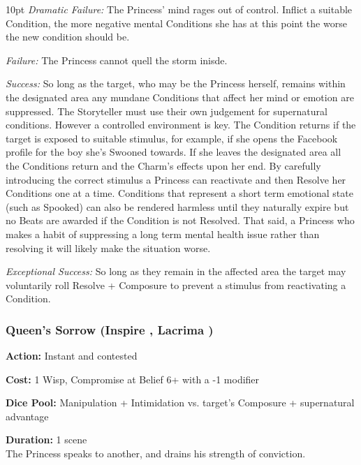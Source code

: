 \begin{myindentpar}{10pt}    \emph{Dramatic Failure:} The Princess' mind rages out of control. Inflict a suitable Condition, the more negative mental Conditions she has at this point the worse the new condition should be.

    \emph{Failure:} The Princess cannot quell the storm inisde. 

    \emph{Success:} So long as the target, who may be the Princess herself, remains within the designated area any mundane Conditions that affect her mind or emotion are suppressed. The Storyteller must use their own judgement for supernatural conditions. However a controlled environment is key. The Condition returns if the target is exposed to suitable stimulus, for example, if she opens the Facebook profile for the boy she's Swooned towards. If she leaves the designated area all the Conditions return and the Charm's effects upon her end. By carefully introducing the correct stimulus a Princess can reactivate and then Resolve her Conditions one at a time. Conditions that represent a short term emotional state (such as Spooked) can also be rendered harmless until they naturally expire but no Beats are awarded if the Condition is not Resolved. That said, a Princess who makes a habit of suppressing a long term mental health issue rather than resolving it will likely make the situation worse. 

    \emph{Exceptional Success:} So long as they remain in the affected area the target may voluntarily roll Resolve + Composure to prevent a stimulus from reactivating a Condition. 

\end{myindentpar}

\subsubsection*{Queen's Sorrow (Inspire \textbullet\textbullet, Lacrima \textbullet\textbullet)}

\noindent \textbf{Action:} Instant and contested

\noindent \textbf{Cost:} 1 Wisp, Compromise at Belief 6+ with a -1 modifier

\noindent \textbf{Dice Pool:} Manipulation + Intimidation vs. target's Composure + supernatural advantage

\noindent \textbf{Duration:} 1 scene \\ 

\noindent The Princess speaks to another, and drains his strength of conviction.

